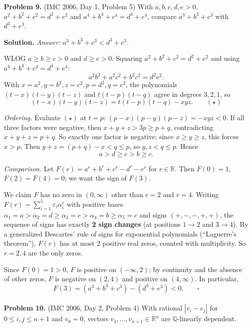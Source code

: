 \documentclass{article}
\newcommand{\R}{\mathbb{R}}
\newcommand{\Q}{\mathbb{Q}}
\begin{document}
\textbf{Problem 9.} (IMC 2006, Day 1, Problem 5)
With \( a, b, c, d, e > 0 \), \( a^2+b^2+c^2 = d^2+e^2 \) and \( a^4+b^4+c^4 = d^4+e^4 \), compare \( a^3+b^3+c^3 \) with \( d^3+e^3 \).

\textbf{Solution.}
\textit{Answer:} \( a^3 + b^3 + c^3 < d^3 + e^3 \).

WLOG \( a \geq b \geq c > 0 \) and \( d \geq e > 0 \). Squaring \( a^2 + b^2 + c^2 = d^2 + e^2 \) and using \( a^4 + b^4 + c^4 = d^4 + e^4 \):
\[
a^2 b^2 + a^2 c^2 + b^2 c^2 = d^2 e^2.
\]
With \( x = a^2, y = b^2, z = c^2, p = d^2, q = e^2 \), the polynomials \( (t-x)(t-y)(t-z) \) and \( t(t-p)(t-q) \) agree in degrees \( 3, 2, 1 \), so
\[
(t-x)(t-y)(t-z) = t(t-p)(t-q) - xyz. \qquad (\star)
\]

\textit{Ordering.} Evaluate \( (\star) \) at \( t = p \): \( (p-x)(p-y)(p-z) = -xyz < 0 \). If all three factors were negative, then \( x + y + z > 3p \geq p + q \), contradicting \( x + y + z = p + q \). So exactly one factor is negative; since \( x \geq y \geq z \), this forces \( x > p \). Then \( y + z = (p+q) - x < q \leq p \), so \( y, z < q \leq p \). Hence
\[
a > d \geq e > b \geq c.
\]

\textit{Comparison.} Let \( F(r) = a^r + b^r + c^r - d^r - e^r \) for \( r \in \R \). Then \( F(0) = 1 \), \( F(2) = F(4) = 0 \); we want the sign of \( F(3) \).

We claim \( F \) has no zero in \( (0, \infty) \) other than \( r = 2 \) and \( r = 4 \). Writing \( F(r) = \sum_{i=1}^5 \varepsilon_i \alpha_i^r \) with positive bases \( \alpha_1 = a > \alpha_2 = d \geq \alpha_3 = e > \alpha_4 = b \geq \alpha_5 = c \) and signs \( (+, -, -, +, +) \), the sequence of signs has exactly \textbf{2 sign changes} (at positions \( 1 \to 2 \) and \( 3 \to 4 \)). By a generalized Descartes' rule of signs for exponential polynomials (``Laguerre's theorem''), \( F(r) \) has at most \( 2 \) positive real zeros, counted with multiplicity. So \( r = 2, 4 \) are the only zeros.

Since \( F(0) = 1 > 0 \), \( F \) is positive on \( (-\infty, 2) \); by continuity and the absence of other zeros, \( F \) is negative on \( (2, 4) \) and positive on \( (4, \infty) \). In particular,
\[
F(3) = (a^3 + b^3 + c^3) - (d^3 + e^3) < 0. \qquad\square
\]
\\

\textbf{Problem 10.} (IMC 2006, Day 2, Problem 4)
With rational \( |v_i - v_j| \) for \( 0 \leq i, j \leq n+1 \) and \( v_0 = 0 \), vectors \( v_1, \ldots, v_{n+1} \in \R^n \) are \( \Q \)-linearly dependent.
\end{document}
